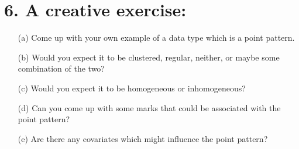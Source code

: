 \documentclass{article}
\begin{document}
\section*{6. A creative exercise:}
\begin{enumerate}
    \item[(a)] Come up with your own example of a data type which is a point pattern.
    
    \item[(b)] Would you expect it to be clustered, regular, neither, or maybe some combination of the two?
    
    \item[(c)] Would you expect it to be homogeneous or inhomogeneous?
    \item[] 
    \item[(d)] Can you come up with some marks that could be associated with the point pattern?
    
    \item[(e)] Are there any covariates which might influence the point pattern?
\end{enumerate}
\end{document}
